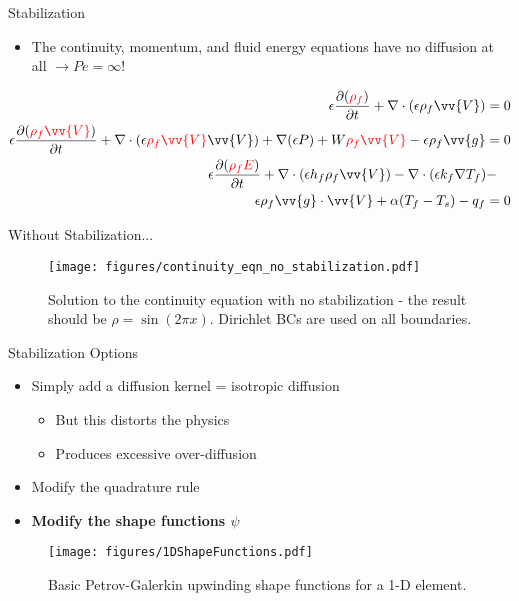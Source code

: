 \documentclass{beamer}
\begin{document}
\begin{frame}{Stabilization}

\begin{itemize}
\item The continuity, momentum, and fluid energy equations have no diffusion at all \(\rightarrow Pe=\infty\)!
\end{itemize}

\begin{equation}
\begin{aligned}
\epsilon\frac{\partial (\color{red}\rho_f\color{black})}{\partial t} + \nabla\cdot(\epsilon\rho_f\vv{V})=0\\
\epsilon\frac{\partial(\color{red}\rho_f\vv{V}\color{black})}{\partial t}+\nabla\cdot(\epsilon\color{red}\rho_f\vv{V}\color{black}\vv{V})+\nabla(\epsilon P)+W\color{red}\rho_f\vv{V}\color{black}-\epsilon\rho_f\vv{g}=0 \\
\epsilon\frac{\partial(\color{red}\rho_f E\color{black})}{\partial t}+\nabla\cdot(\epsilon h_f\rho_f\vv{V})-\nabla\cdot(\epsilon k_f\nabla T_f) -\quad\\
 \epsilon\rho_f \vv{g}\cdot\vv{V}+\alpha(T_f-T_s)-q_f=0\\
\end{aligned}
\end{equation}

\end{frame}


\begin{frame}{Without Stabilization...}

\begin{figure}[H]
  \centering
  \texttt{[image: figures/continuity\_eqn\_no\_stabilization.pdf]}
  \caption{Solution to the continuity equation with no stabilization - the result should be \(\rho=\sin{(2\pi x)}\). Dirichlet BCs are used on all boundaries.}
\end{figure}

\end{frame}


\begin{frame}{Stabilization Options}

\begin{itemize}
\item Simply add a diffusion kernel = isotropic diffusion
	\begin{itemize}
		\item But this distorts the physics
		\item Produces excessive over-diffusion
	\end{itemize}
\item Modify the quadrature rule
\item \textbf{Modify the shape functions \(\psi\)}
\end{itemize}

\begin{figure}[H]
  \centering
  \texttt{[image: figures/1DShapeFunctions.pdf]}
  \caption{Basic Petrov-Galerkin upwinding shape functions for a 1-D element.}
\end{figure}

\end{frame}
\end{document}
